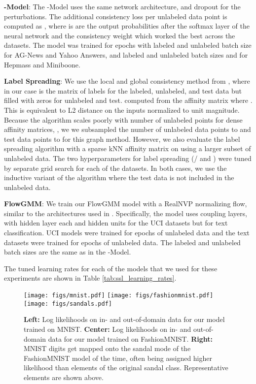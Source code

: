 \documentclass{article}
\newcommand{\method}{FlowGMM\xspace}
\begin{document}
\textbf{-Model}: The -Model uses the same network architecture, and dropout for the perturbations. The additional consistency loss per unlabeled data point is computed as , where  is are the output probabilities after the softmax layer of the neural network and the consistency weight  which worked the best across the datasets. The model was trained for  epochs with labeled and unlabeled batch size  for AG-News and Yahoo Answers, and labeled and unlabeled batch sizes  and  for Hepmass and Miniboone.

\textbf{Label Spreading}: We use the local and global consistency method from \citet{zhou2004learning},  where in our case  is the matrix of labels for the labeled, unlabeled, and test data but filled with zeros for unlabeled and test.  computed from the affinity matrix  where . This is equivalent to L2 distance on the inputs normalized to unit magnitude. Because the algorithm scales poorly with number of unlabeled points for dense affinity matrices, , we we subsampled the number of unlabeled data points to  and test data points to  for this graph method. However, we also evaluate the label spreading algorithm with a sparse kNN affinity matrix on using a larger subset  of unlabeled data. The two hyperparameters for label spreading (/ and ) were tuned by separate grid search for each of the datasets. In both cases, we use the inductive variant of the algorithm where the test data is not included in the unlabeled data. 

\textbf{\method}:
We train our \method model with a RealNVP normalizing flow, similar to the architectures used in \citet{papamakarios2017masked}. Specifically, the model uses  coupling layers, with  hidden layer each and  hidden units for the UCI datasets but  for text classification. UCI models were trained for  epochs of unlabeled data and the text datasets were trained for  epochs of unlabeled data. The labeled and unlabeled batch sizes are the same as in the -Model.

The tuned learning rates for each of the models that we used for these experiments are shown in Table \ref{tab:ssl_learning_rates}.

\begin{figure*}[t]
	\texttt{[image: figs/mnist.pdf]}
	\texttt{[image: figs/fashionmnist.pdf]}
	\texttt{[image: figs/sandals.pdf]}
	\caption{
	\textbf{Left:} Log likelihoods on in- and out-of-domain data for our model trained on MNIST.
    \textbf{Center:} Log likelihoods on in- and out-of-domain data for our model trained on FashionMNIST.
    \textbf{Right:} MNIST digits get mapped onto the sandal mode of the FashionMNIST model  of the time, often being assigned higher likelihood than elements of the original sandal class. Representative elements are shown above.
	}
	\label{fig:mnist_notmnist}
    \vspace{-.3cm}
\end{figure*}
\end{document}
